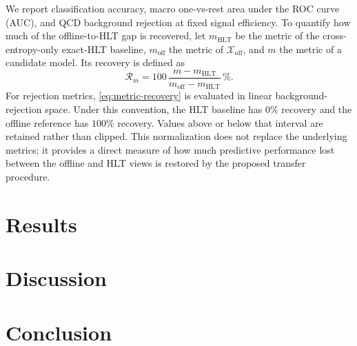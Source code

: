 \documentclass[11pt]{article}
\newcommand{\xoff}{\mathcal{X}_{\mathrm{off}}}
\begin{document}
We report classification accuracy, macro one-vs-rest area under the ROC curve
(AUC), and QCD background rejection at fixed signal efficiency.  To quantify
how much of the offline-to-HLT gap is recovered, let $m_{\mathrm{HLT}}$ be the
metric of the cross-entropy-only exact-HLT baseline, $m_{\mathrm{off}}$ the
metric of $\xoff$, and $m$ the metric of a candidate model.  Its recovery is
defined as
\begin{equation}
    \mathcal{R}_{m}
      = 100\,
        \frac{m-m_{\mathrm{HLT}}}
             {m_{\mathrm{off}}-m_{\mathrm{HLT}}}\,\%.
    \label{eq:metric-recovery}
\end{equation}
For rejection metrics, \cref{eq:metric-recovery} is evaluated in linear
background-rejection space.  Under this convention, the HLT baseline has
$0\%$ recovery and the offline reference has $100\%$ recovery.  Values above
or below that interval are retained rather than clipped.  This normalization
does not replace the underlying metrics; it provides a direct measure of how
much predictive performance lost between the offline and HLT views is restored
by the proposed transfer procedure.

\section{Results}
\label{sec:results}

\section{Discussion}
\label{sec:discussion}

\section{Conclusion}
\label{sec:conclusion}



\end{document}

